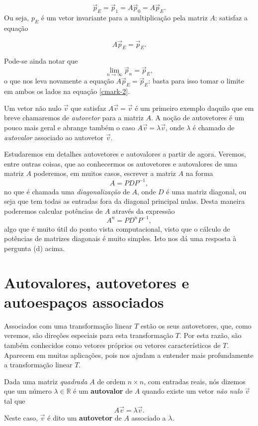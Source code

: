 \documentclass[../livro.tex]{subfiles}  %
\begin{document}
$$ \vec{p}_E =  \vec p_1 = A \vec p_0 = A \vec{p}_E.$$
Ou seja, $p_E$ é um vetor invariante para a multiplicação pela matriz $A$: satisfaz a equação

$$ A \vec{p}_E =   \vec{p}_E.$$


Pode-se ainda notar que $$\lim\limits_{n\to \infty}\vec{p}_n = \vec p_E,$$ o que nos leva novamente a equação $ A \vec{p}_E = \vec{p}_E$: basta para isso tomar o limite em ambos os lados na equação \eqref{cmark-2}.

Um vetor não nulo $\vec v$ que satisfaz $A \vec v = \vec v$ é um primeiro exemplo daquilo que em breve chamaremos de {\it autovetor } para a matriz $A$. A noção de autovetores é um pouco mais geral e abrange também o caso $A \vec v = \lambda \vec v$, onde $\lambda$ é chamado de {\it autovalor } associado ao autovetor $\vec v$.

Estudaremos em detalhes autovetores e autovalores a partir de agora. Veremos, entre outras coisas, que ao conhecermos os autovetores e autovalores de uma matriz $A$
poderemos, em muitos casos, escrever a matriz $A$ na forma
$$A = P D P^{-1},$$
no que é chamada uma {\it diagonalização} de $A$, onde $D$ é uma matriz diagonal, ou seja que tem todas as entradas fora da diagonal principal nulas. Desta maneira poderemos calcular potências de $A$ através da expressão
$$A^n = P D^n P^{-1},$$
algo que é muito útil do ponto vista computacional, visto que o cálculo de potências de matrizes diagonais é muito simples. Isto nos dá uma resposta à pergunta (d) acima.


\section{Autovalores, autovetores e autoespaços associados}


Associados com uma transformação linear $T$ estão os seus autovetores, que, como veremos, são direções especiais para esta transformação $T$. Por esta razão, são também conhecidos como vetores próprios ou vetores característicos de $T$. Aparecem em muitas aplicações, pois nos ajudam a entender mais profundamente a transformação linear $T$.

Dada uma matriz \textit{quadrada} $A$ de ordem $n \times n$, com entradas reais, nós dizemos que um número $\lambda \in \mathbb{R}$ é um \textbf{autovalor} de $A$ quando existe um vetor \textit{não nulo} $\vec{v}$ tal que
\begin{equation}
A \vec{v} = \lambda \vec{v}.
\end{equation} Neste caso, $\vec{v}$ é dito um \textbf{autovetor} de $A$ associado a $\lambda$.
\end{document}
